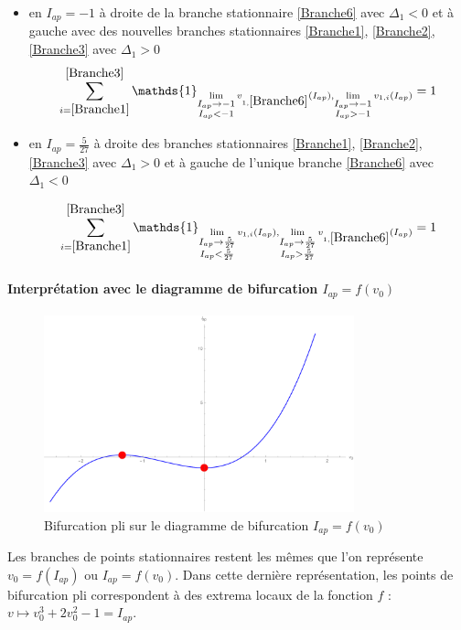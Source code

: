 \documentclass[12pt,a4paper,onecolumn]{article}
\begin{document}
\begin{itemize}
\item en $I_{ap} = -1$ à droite de la branche stationnaire \ref{Branche6} avec $\Delta_1 < 0$ et à gauche avec des nouvelles branches stationnaires \ref{Branche1}, \ref{Branche2}, \ref{Branche3} avec $\Delta_1 > 0$
$$\displaystyle{\sum_{i = \ref{Branche1}}^{\ref{Branche3}}\mathds{1}_{\lim\limits_{\substack{I_{ap} \rightarrow -1 \\ I_{ap} < -1}}v_{1, \ref{Branche6}}(I_{ap}), \lim\limits_{\substack{I_{ap} \rightarrow -1 \\ I_{ap} > -1}}v_{1, i}(I_{ap})}} = 1$$
\item en $I_{ap} = \frac{5}{27}$ à droite des branches stationnaires \ref{Branche1}, \ref{Branche2}, \ref{Branche3} avec $\Delta_1 > 0$ et à gauche de l'unique branche \ref{Branche6} avec $\Delta_1 < 0$

$$\displaystyle{\sum_{i = \ref{Branche1}}^{\ref{Branche3}}\mathds{1}_{\lim\limits_{\substack{I_{ap} \rightarrow \frac{5}{27} \\ I_{ap} < \frac{5}{27}}}v_{1, i}(I_{ap}), \lim\limits_{\substack{I_{ap} \rightarrow \frac{5}{27} \\ I_{ap} > \frac{5}{27}}}v_{1, \ref{Branche6}}(I_{ap})}} = 1$$
\end{itemize}

\paragraph{Interprétation avec le diagramme de bifurcation \texorpdfstring{$I_{ap}= f(v_0)$}{Lg}}

\begin{figure}[H]
\begin{center}
\includegraphics[origin =c, width = 0.8\textwidth]{BifurcationInv}
\end{center}
\caption{Bifurcation pli sur le diagramme de bifurcation $I_{ap}= f(v_0)$}
\end{figure}
Les branches de points stationnaires restent les mêmes que l'on représente $v_0=f(I_{ap})$ ou $I_{ap}= f(v_0)$. Dans cette dernière représentation, les points de bifurcation pli correspondent à des extrema locaux de la fonction $f$ : $v \longmapsto v_0^3 + 2v_0^2 -1 = I_{ap}$.
\end{document}
